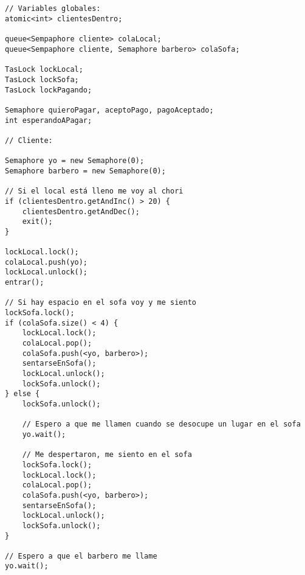 \subsection{}

\begin{codesnippet}
\begin{verbatim}
// Variables globales:
atomic<int> clientesDentro;

queue<Sempaphore cliente> colaLocal;
queue<Sempaphore cliente, Semaphore barbero> colaSofa;

TasLock lockLocal;
TasLock lockSofa;
TasLock lockPagando;

Semaphore quieroPagar, aceptoPago, pagoAceptado;
int esperandoAPagar;

// Cliente:

Semaphore yo = new Semaphore(0);
Semaphore barbero = new Semaphore(0);

// Si el local está lleno me voy al chori
if (clientesDentro.getAndInc() > 20) {
    clientesDentro.getAndDec();
    exit();
}

lockLocal.lock();
colaLocal.push(yo);
lockLocal.unlock();
entrar();

// Si hay espacio en el sofa voy y me siento
lockSofa.lock();
if (colaSofa.size() < 4) {
    lockLocal.lock();
    colaLocal.pop();
    colaSofa.push(<yo, barbero>);
    sentarseEnSofa();
    lockLocal.unlock();
    lockSofa.unlock();
} else {
    lockSofa.unlock();

    // Espero a que me llamen cuando se desocupe un lugar en el sofa
    yo.wait();

    // Me despertaron, me siento en el sofa
    lockSofa.lock();
    lockLocal.lock();
    colaLocal.pop();
    colaSofa.push(<yo, barbero>);
    sentarseEnSofa();
    lockLocal.unlock();
    lockSofa.unlock();
}

// Espero a que el barbero me llame
yo.wait();

\end{verbatim}
\end{codesnippet}

